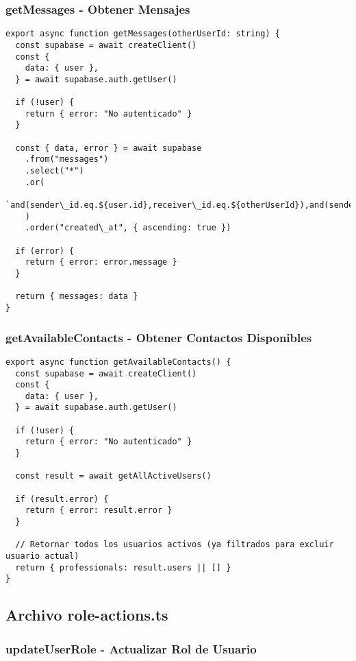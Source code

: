 \documentclass[12pt,a4paper]{article}
\begin{document}
\subsubsection{getMessages - Obtener Mensajes}

\begin{lstlisting}[caption=Función getMessages completa]
export async function getMessages(otherUserId: string) {
  const supabase = await createClient()
  const {
    data: { user },
  } = await supabase.auth.getUser()

  if (!user) {
    return { error: "No autenticado" }
  }

  const { data, error } = await supabase
    .from("messages")
    .select("*")
    .or(
      `and(sender\_id.eq.${user.id},receiver\_id.eq.${otherUserId}),and(sender\_id.eq.${otherUserId},receiver\_id.eq.${user.id})`,
    )
    .order("created\_at", { ascending: true })

  if (error) {
    return { error: error.message }
  }

  return { messages: data }
}
\end{lstlisting}

\subsubsection{getAvailableContacts - Obtener Contactos Disponibles}

\begin{lstlisting}[caption=Función getAvailableContacts completa]
export async function getAvailableContacts() {
  const supabase = await createClient()
  const {
    data: { user },
  } = await supabase.auth.getUser()

  if (!user) {
    return { error: "No autenticado" }
  }

  const result = await getAllActiveUsers()

  if (result.error) {
    return { error: result.error }
  }

  // Retornar todos los usuarios activos (ya filtrados para excluir usuario actual)
  return { professionals: result.users || [] }
}
\end{lstlisting}

\subsection{Archivo role-actions.ts}

\subsubsection{updateUserRole - Actualizar Rol de Usuario}
\end{document}
